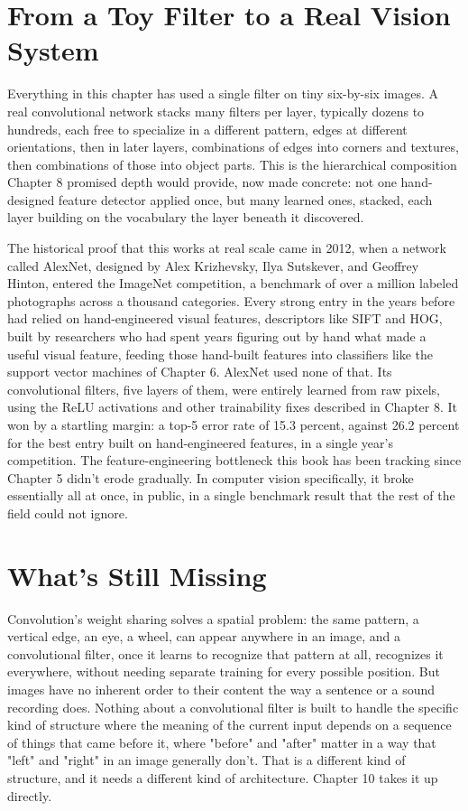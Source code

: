 \section*{From a Toy Filter to a Real Vision System}

Everything in this chapter has used a single filter on tiny six-by-six images. A real convolutional network stacks many filters per layer, typically dozens to hundreds, each free to specialize in a different pattern, edges at different orientations, then in later layers, combinations of edges into corners and textures, then combinations of those into object parts. This is the hierarchical composition Chapter 8 promised depth would provide, now made concrete: not one hand-designed feature detector applied once, but many learned ones, stacked, each layer building on the vocabulary the layer beneath it discovered.

The historical proof that this works at real scale came in 2012, when a network called AlexNet, designed by Alex Krizhevsky, Ilya Sutskever, and Geoffrey Hinton, entered the ImageNet competition, a benchmark of over a million labeled photographs across a thousand categories. Every strong entry in the years before had relied on hand-engineered visual features, descriptors like SIFT and HOG, built by researchers who had spent years figuring out by hand what made a useful visual feature, feeding those hand-built features into classifiers like the support vector machines of Chapter 6. AlexNet used none of that. Its convolutional filters, five layers of them, were entirely learned from raw pixels, using the ReLU activations and other trainability fixes described in Chapter 8. It won by a startling margin: a top-5 error rate of 15.3 percent, against 26.2 percent for the best entry built on hand-engineered features, in a single year's competition. The feature-engineering bottleneck this book has been tracking since Chapter 5 didn't erode gradually. In computer vision specifically, it broke essentially all at once, in public, in a single benchmark result that the rest of the field could not ignore.

\section*{What's Still Missing}

Convolution's weight sharing solves a spatial problem: the same pattern, a vertical edge, an eye, a wheel, can appear anywhere in an image, and a convolutional filter, once it learns to recognize that pattern at all, recognizes it everywhere, without needing separate training for every possible position. But images have no inherent order to their content the way a sentence or a sound recording does. Nothing about a convolutional filter is built to handle the specific kind of structure where the meaning of the current input depends on a sequence of things that came before it, where "before" and "after" matter in a way that "left" and "right" in an image generally don't. That is a different kind of structure, and it needs a different kind of architecture. Chapter 10 takes it up directly.
